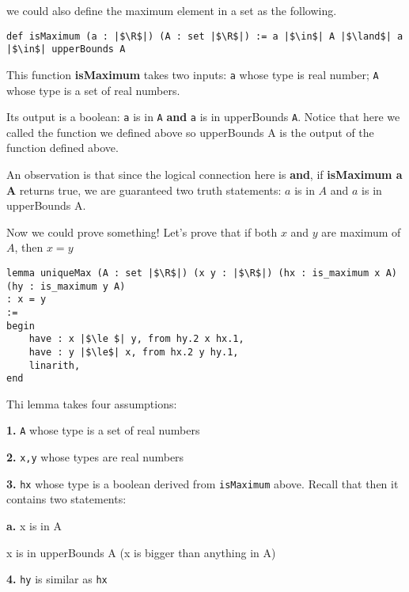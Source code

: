 \documentclass[a4paper]{article}
\newcommand{\R}{\mathbb{R}}
\begin{document}
we could also define the maximum element in a set as the following.

\begin{listing}[!ht]
\begin{verbatim}
def isMaximum (a : |$\R$|) (A : set |$\R$|) := a |$\in$| A |$\land$| a |$\in$| upperBounds A
\end{verbatim}
\end{listing}

This function \textbf{isMaximum} takes two inputs: \texttt{a} whose type is real number; \texttt{A} whose type is a set of real numbers.

Its output is a boolean: \texttt{a} is in \texttt{A}  \textbf{and} \texttt{a} is in upperBounds \texttt{A}. Notice that here we called the function we defined above so upperBounds A is the output of the function defined above.

An observation is that since the logical connection here is \textbf{and}, if \textbf{isMaximum a A} returns true, we are guaranteed two truth statements: $a$ is in  $A$ and  $a$ is in upperBounds A.  

\bigskip

Now we could prove something! Let's prove that if both  $x$ and  $y$ are maximum of  $A$, then  $x = y$

\begin{listing}[!ht]
\begin{verbatim}
lemma uniqueMax (A : set |$\R$|) (x y : |$\R$|) (hx : is_maximum x A) (hy : is_maximum y A) 
: x = y 
:= 
begin
 	have : x |$\le $| y, from hy.2 x hx.1,
	have : y |$\le$| x, from hx.2 y hy.1,
	linarith,
end
\end{verbatim}
	
\end{listing}

Thi lemma takes four assumptions: 

\textbf{1.} \texttt{A} whose type is a set of real numbers

\textbf{2. } \texttt{x,y} whose types are real numbers

\textbf{3. } \texttt{hx} whose type is a boolean derived from \texttt{isMaximum} above. Recall that then it contains two statements: 

\quad \textbf{a.} x is in A

 x is in upperBounds A (x is bigger than anything in A)

\textbf{4. } \texttt{hy} is similar as \texttt{hx} 
\end{document}
